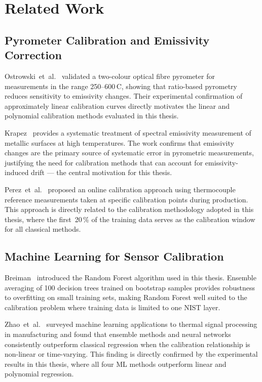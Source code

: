 \section{Related Work}
\label{sec:related_work}

\subsection{Pyrometer Calibration and Emissivity Correction}

Ostrowski~et~al.~\cite{optical_pyrometer_validation} validated a two-colour optical fibre pyrometer for measurements in the range 250--600\,\textdegree C, showing that ratio-based pyrometry reduces sensitivity to emissivity changes. Their experimental confirmation of approximately linear calibration curves directly motivates the linear and polynomial calibration methods evaluated in this thesis.

Krapez~\cite{emissivity_measurement} provides a systematic treatment of spectral emissivity measurement of metallic surfaces at high temperatures. The work confirms that emissivity changes are the primary source of systematic error in pyrometric measurements, justifying the need for calibration methods that can account for emissivity-induced drift --- the central motivation for this thesis.

Perez~et~al.~\cite{online_pyrometry_calibration} proposed an online calibration approach using thermocouple reference measurements taken at specific calibration points during production. This approach is directly related to the calibration methodology adopted in this thesis, where the first~20\,\% of the training data serves as the calibration window for all classical methods.

\subsection{Machine Learning for Sensor Calibration}

Breiman~\cite{random_forest_breiman} introduced the Random Forest algorithm used in this thesis. Ensemble averaging of 100 decision trees trained on bootstrap samples provides robustness to overfitting on small training sets, making Random Forest well suited to the calibration problem where training data is limited to one NIST layer.

Zhao~et~al.~\cite{ml_thermal_processing} surveyed machine learning applications to thermal signal processing in manufacturing and found that ensemble methods and neural networks consistently outperform classical regression when the calibration relationship is non-linear or time-varying. This finding is directly confirmed by the experimental results in this thesis, where all four ML methods outperform linear and polynomial regression.


